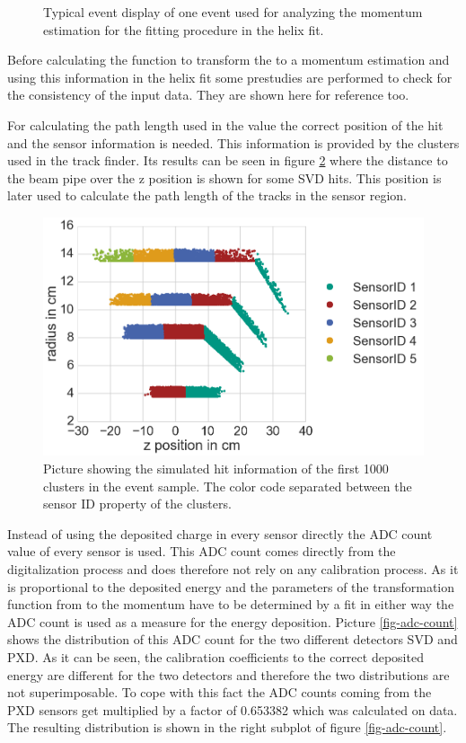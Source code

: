 \begin{figure}
 \centering
 \caption{Typical event display of one event used for analyzing the momentum estimation for the fitting procedure in the helix fit.}
 \label{fig-vxd-event-display}
\end{figure}

Before calculating the function to transform the \dedx to a momentum estimation and using this information in the helix fit some prestudies are performed to check for the consistency of the input data. They are shown here for reference too.

For calculating the path length used in the \dedx value the correct position of the hit and the sensor information is needed. This information is provided by the clusters used in the track finder. Its results can be seen in figure \ref{fig-cluster-position} where the distance to the beam pipe over the z position is shown for some SVD hits. This position is later used to calculate the path length of the tracks in the sensor region.

\begin{figure}
 \centering
 \includegraphics[width=0.8\linewidth]{figures/vxd/cluster_positions.png}
 \caption{Picture showing the simulated hit information of the first 1000 clusters in the event sample. The color code separated between the sensor ID property of the clusters.}
 \label{fig-cluster-position}
\end{figure}

Instead of using the deposited charge in every sensor directly the ADC count value of every sensor is used. This ADC count comes directly from the digitalization process and does therefore not rely on any calibration process. As it is proportional to the deposited energy and the parameters of the transformation function from \dedx to the momentum have to be determined by a fit in either way the ADC count is used as a measure for the energy deposition. Picture \ref{fig-adc-count} shows the distribution of this ADC count for the two different detectors SVD and PXD. As it can be seen, the calibration coefficients to the correct deposited energy are different for the two detectors and therefore the two distributions are not superimposable. To cope with this fact the ADC counts coming from the PXD sensors get multiplied by a factor of 0.653382 which was calculated on data. The resulting distribution is shown in the right subplot of figure \ref{fig-adc-count}.

